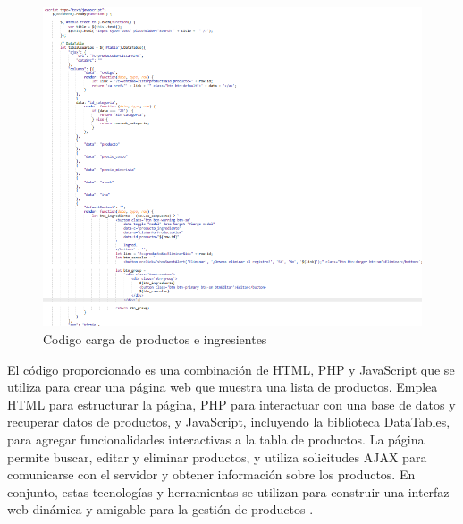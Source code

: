   \begin{figure}[H]
    \begin{center}
      \includegraphics[scale=0.90]{./sistema/producto_codigo.png}
      \caption{Codigo carga de productos e ingresientes}
      \label{fig:product}
    \end{center}
  \end{figure}

El código proporcionado es una combinación de HTML, PHP y JavaScript que se utiliza para crear una página web que muestra una lista de productos. Emplea HTML para estructurar la página, PHP para interactuar con una base de datos y recuperar datos de productos, y JavaScript, incluyendo la biblioteca DataTables, para agregar funcionalidades interactivas a la tabla de productos. La página permite buscar, editar y eliminar productos, y utiliza solicitudes AJAX para comunicarse con el servidor y obtener información sobre los productos. En conjunto, estas tecnologías y herramientas se utilizan para construir una interfaz web dinámica y amigable para la gestión de productos \cite{eguiluz2012introduccion}.

